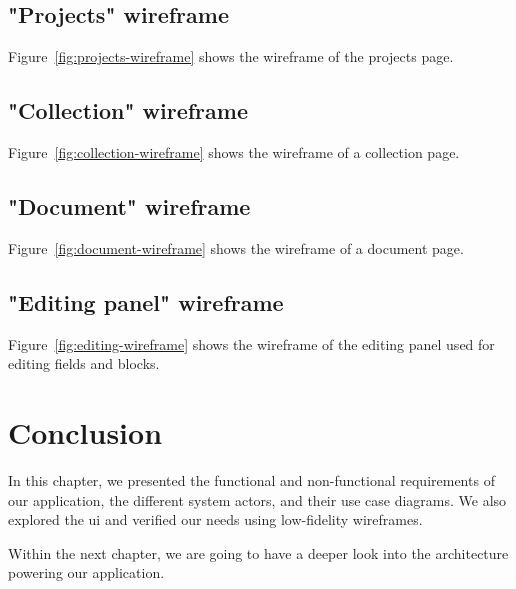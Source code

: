 
\subsection{"Projects" wireframe}
Figure~\ref{fig:projects-wireframe} shows the wireframe of the projects page.



\subsection{"Collection" wireframe}
Figure~\ref{fig:collection-wireframe} shows the wireframe of a collection page.



\subsection{"Document" wireframe}
Figure~\ref{fig:document-wireframe} shows the wireframe of a document page.



\subsection{"Editing panel" wireframe}
Figure~\ref{fig:editing-wireframe} shows the wireframe of the editing panel used for editing fields and blocks.



\section{Conclusion}

In this chapter, we presented the functional and non-functional requirements of our application, the different system actors, and their use case diagrams.
We also explored the \acrlong{ui} and verified our needs using low-fidelity wireframes.

Within the next chapter, we are going to have a deeper look into the architecture powering our application.

